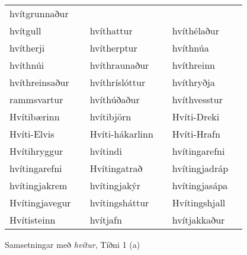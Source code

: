 \documentclass{../litmal.tex}{subfiles}
\begin{document}
\begin{wordlist}[H]
\begin{tcolorbox}
\begin{tabular}{BlBlBl}
		hvítgrunnaður &		\\  %
		hvítgull		&		& 
		hvíthattur	&		& 
		hvíthélaður	& 		\\  %
		hvítherji		&		& 
		hvítherptur	&		& 
		hvíthnúa		&		\\  %
		hvíthnúi		&		& 
		hvíthraunaður &		& 
		hvíthreinn	&		\\  %
		hvíthreinsaður &		& 
		hvíthríslóttur	&		& 
		hvíthryðja	&		\\  %
		rammsvartur	&		& 
		hvíthúðaður	&		& 
		hvíthvesstur	&		\\  %
		Hvítibærinn	&		& 
		hvítibjörn	&		& 
		Hvíti-Dreki	&		\\  %
		Hvíti-Elvis	&		& 
		Hvíti-hákarlinn & 		& 
		Hvíti-Hrafn	&		\\  %
		Hvítihryggur	&		& 
		hvítindi		&		& 
		hvítingarefni 	&		\\  %
		hvítingarefni	&		& 
		Hvítingatrað	&		& 
		hvítingjadráp &		\\  %
		hvítingjakrem & 		& 
		hvítingjakýr	&		& 
		hvítingjasápa &		\\  %
		Hvítingjavegur &		& 
		hvítingsháttur &		& 
		Hvítingshjall	&		\\  %
		Hvítisteinn	&		& 
		hvítjafn		&		& 
		hvítjakkaður	&		  %
	\end{tabular}
\end{tcolorbox}
	\caption{Samsetningar með \textit{hvítur}, Tíðni 1 (a)}
	\label{listi:hvitt:1a}
\end{wordlist}	
		
\end{document}
